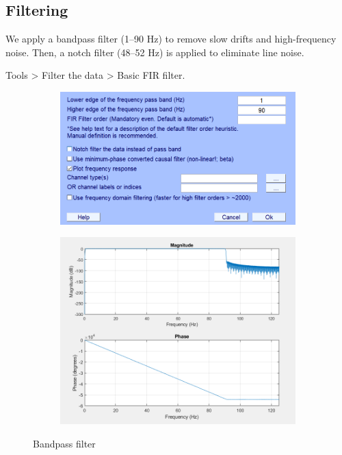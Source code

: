 \documentclass[hidelinks,12pt]{article}
\begin{document}
	\subsection{Filtering}
	We apply a bandpass filter (1–90 Hz) to remove slow drifts and high-frequency noise. Then, a notch filter (48–52 Hz) is applied to eliminate line noise.
	
	Tools > Filter the data > Basic FIR filter.
	
	\begin{figure}[!h]
		\centering
		\begin{subfigure}{0.45\textwidth}
			\centering
			\includegraphics[width=\linewidth]{3}
			\vspace{0.5cm}
		\end{subfigure}
		\hfill
		\begin{subfigure}{0.45\textwidth}
			\centering
			\includegraphics[width=\linewidth]{4}
		\end{subfigure}
		\caption{Bandpass filter}
	\end{figure}
	
\end{document}
